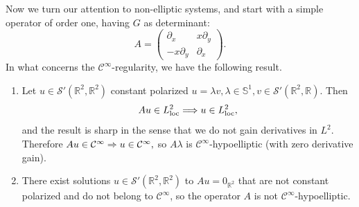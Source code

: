 \documentclass[AHL,Unicode,longabstracts,published]{cedram}
\DeclareMathOperator{\locc}{loc}
\newcommand{\bbR}{\mathbb{R}}
\newcommand{\bbS}{\mathbb{S}}
\newcommand{\clC}{\mathcal{C}}
\newcommand{\clS}{\mathcal{S}}
\renewcommand*{\implies}{\mathchoice{\Longrightarrow}{\Rightarrow}{\Rightarrow}{\Rightarrow}}
\newcommand*{\relabel}{\renewcommand{\labelenumi}{(\theenumi)}}
\newcommand*{\romanenumi}{\renewcommand*{\theenumi}{\roman{enumi}}\relabel}
\begin{document}
Now we turn our attention to non-elliptic systems, and start with a simple operator of order one, having $G$ as determinant:
\[
A=
\begin{pmatrix}
\partial_{x} & x\partial_{y}\\
-x\partial_{y} & \partial_{x}
\end{pmatrix}.
\]
In what concerns the $\clC^\infty$-regularity, we have the following result.

\begin{theo}\leavevmode
\label{thvectcinfty}
\begin{enumerate}\romanenumi
\item\label{theo1.3.1} Let $u\in \clS'(\bbR^2,\bbR^2)$ constant polarized $u=\lambda v,\lambda\in \bbS^1, v\in \clS'(\bbR^2,\bbR)$. Then
\[
Au\in L^2_{\locc} \implies u\in L^2_{\locc},
\]
and the result is sharp in the sense that we do not gain derivatives in $L^2$. Therefore $Au\in\clC^\infty \implies u\in\clC^\infty,$ so $A\lambda$ is $\clC^\infty$-hypoelliptic (with zero derivative gain).


\item\label{theo1.3.2} There exist solutions $u\in \clS'(\bbR^2,\bbR^2)$ to $Au=0_{\bbR^2}$ that are not constant polarized and do not belong to $\clC^\infty$, so the operator $A$ is not $\clC^\infty$-hypoelliptic.
\end{enumerate}
\end{theo}
\end{document}
